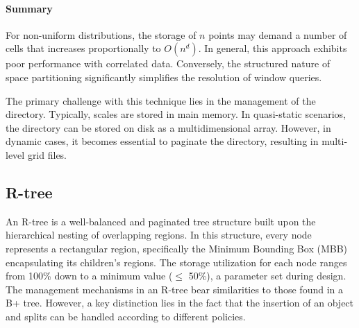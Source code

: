 \paragraph*{Summary}
For non-uniform distributions, the storage of $n$ points may demand a number of cells that increases proportionally to $O(n^d)$.
In general, this approach exhibits poor performance with correlated data.
Conversely, the structured nature of space partitioning significantly simplifies the resolution of window queries.

The primary challenge with this technique lies in the management of the directory. 
Typically, scales are stored in main memory.
In quasi-static scenarios, the directory can be stored on disk as a multidimensional array.
However, in dynamic cases, it becomes essential to paginate the directory, resulting in multi-level grid files.

\subsection{R-tree}
An R-tree is a well-balanced and paginated tree structure built upon the hierarchical nesting of overlapping regions.
In this structure, every node represents a rectangular region, specifically the Minimum Bounding Box (MBB) encapsulating its children's regions.
The storage utilization for each node ranges from 100\% down to a minimum value ($\leq$ 50\%), a parameter set during design.
The management mechanisms in an R-tree bear similarities to those found in a B+ tree. 
However, a key distinction lies in the fact that the insertion of an object and splits can be handled according to different policies.

